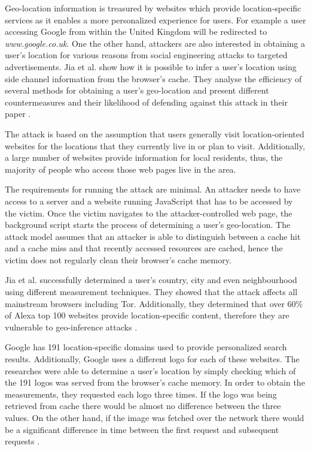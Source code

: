 \documentclass[10pt,a4paper,twoside]{book}
\begin{document}
Geo-location information is treasured by websites which provide location-specific services as it enables a more personalized experience for users. For example a user accessing Google from within the United Kingdom will be redirected to \textit{www.google.co.uk}. One the other hand, attackers are also interested in obtaining a user's location for various reasons from social engineering attacks to targeted advertisements. Jia et al. show how it is possible to infer a user's location using side channel information from the browser's cache. They analyse the efficiency of several methods for obtaining a user's geo-location and present different countermeasures and their likelihood of defending against this attack in their paper \cite{jia2015know}.

The attack is based on the assumption that users generally visit location-oriented websites for the locations that they currently live in or plan to visit. Additionally, a large number of websites provide information for local residents, thus, the majority of people who access those web pages live in the area. 

The requirements for running the attack are minimal. An attacker needs to have access to a server and a website running JavaScript that has to be accessed by the victim. Once the victim navigates to the attacker-controlled web page, the background script starts the process of determining a user's geo-location. The attack model assumes that an attacker is able to distinguish between a cache hit and a cache miss and that recently accessed resources are cached, hence the victim does not regularly clean their browser's cache memory.

Jia et al. successfully determined a user's country, city and even neighbourhood using different measurement techniques. They showed that the attack affects all mainstream browsers including Tor. Additionally, they determined that over 60\% of Alexa top 100 \cite{alexa500} websites provide location-specific content, therefore they are vulnerable to geo-inference attacks \cite{jia2015know}.

Google has 191 location-specific domains used to provide personalized search results. Additionally, Google uses a different logo for each of these websites. The researches were able to determine a user's location by simply checking which of the 191 logos was served from the browser's cache memory. In order to obtain the measurements, they requested each logo three times. If the logo was being retrieved from cache there would be almost no difference between the three values. On the other hand, if the image was fetched over the network there would be a significant difference in time between the first request and subsequent requests \cite{jia2015know}.
\end{document}

